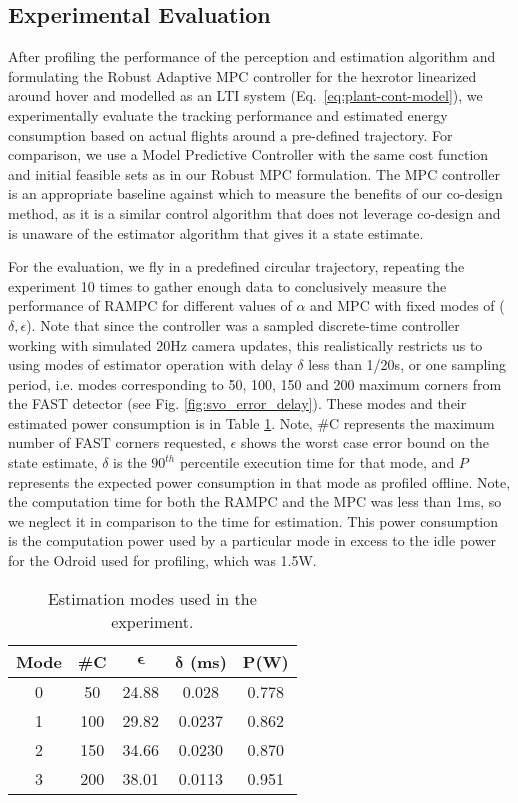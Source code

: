 \subsection{Experimental Evaluation}
\label{sec:exp_eval}
After profiling the performance of the perception and estimation algorithm and formulating the Robust Adaptive MPC controller for the hexrotor linearized around hover and modelled as an LTI system (Eq.~\ref{eq:plant-cont-model}), we experimentally evaluate the tracking performance and estimated energy consumption based on actual flights around a pre-defined trajectory. 
For comparison, we use a Model Predictive Controller with the same cost function and initial feasible sets as in our Robust MPC formulation. 
The MPC controller is an appropriate baseline against which to measure the benefits of our co-design method, as it is a similar control algorithm that does not leverage co-design and is unaware of the estimator algorithm that gives it a state estimate. 

For the evaluation, we fly in a predefined circular trajectory, repeating the experiment 10 times to gather enough data to conclusively measure the performance of RAMPC for different values of $\alpha$ and MPC with fixed modes of ($\delta,\epsilon$). 
Note that since the controller was a sampled discrete-time controller working with simulated 20Hz camera updates, this realistically restricts us to using modes of estimator operation with delay $\delta$ less than 1/20s, or one sampling period, i.e. modes corresponding to 50, 100, 150 and 200 maximum corners from the FAST detector (see Fig. \ref{fig:svo_error_delay}). 
These modes and their estimated power consumption is in Table \ref{tbl:modes_exp}. 
Note, \#C represents the maximum number of FAST corners requested, $\epsilon$ shows the worst case error bound on the state estimate, $\delta$ is the $90^{th}$ percentile execution time for that mode, and $P$ represents the expected power consumption in that mode as profiled offline. Note, the computation time for both the RAMPC and the MPC was less than 1ms, so we neglect it in comparison to the time for estimation.
This power consumption is the computation power used by a particular mode in excess to the idle power for the Odroid used for profiling, which was 1.5W.

\begin{table}[htb]
\begin{center}
\caption{Estimation modes used in the experiment.}
\label{tbl:modes_exp}
\begin{tabular} {|c|c|c|c|c|}
	\hline
	\textbf{Mode} & \textbf{\#C} & $\pmb{\epsilon}$ & $\pmb{\delta}$ \textbf{(ms)} & $\pmb{P}$\textbf{(W)} \\ \hline
	0 & 50 &  24.88 & 0.028 &  0.778  \\ \hline
 	1 & 100 & 29.82 & 0.0237 &  0.862  \\ \hline
	2 & 150 & 34.66 & 0.0230 & 0.870 \\ \hline
	3 & 200 & 38.01 & 0.0113 & 0.951 \\ \hline
	\end{tabular}	
	\end{center}
\end{table}


